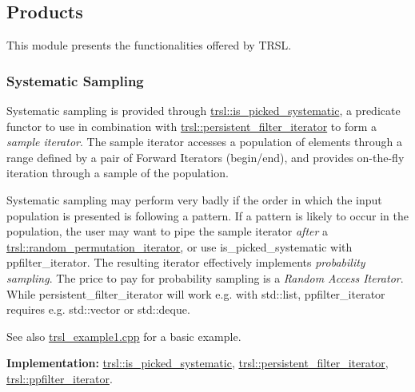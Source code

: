 \hypertarget{group__products}{
\subsection{Products}
\label{group__products}
}
This module presents the functionalities offered by TRSL.



\hypertarget{group__products_products_systematic_sampling}{}\subsubsection{Systematic Sampling}\label{group__products_products_systematic_sampling}
Systematic sampling is provided through \hyperlink{classtrsl_1_1is__picked__systematic}{trsl::is\_\-picked\_\-systematic}, a predicate functor to use in combination with \hyperlink{classtrsl_1_1persistent__filter__iterator}{trsl::persistent\_\-filter\_\-iterator} to form a {\itshape sample iterator\/}. The sample iterator accesses a population of elements through a range defined by a pair of Forward Iterators (begin/end), and provides on-\/the-\/fly iteration through a sample of the population.

Systematic sampling may perform very badly if the order in which the input population is presented is following a pattern. If a pattern is likely to occur in the population, the user may want to pipe the sample iterator {\itshape after\/} a \hyperlink{namespacetrsl_afb566791dfade70af49beaa5b816e7ee}{trsl::random\_\-permutation\_\-iterator}, or use is\_\-picked\_\-systematic with ppfilter\_\-iterator. The resulting iterator effectively implements {\itshape probability sampling\/}. The price to pay for probability sampling is a {\itshape Random Access Iterator\/}. While persistent\_\-filter\_\-iterator will work e.g. with {\ttfamily std::list}, ppfilter\_\-iterator requires e.g. {\ttfamily std::vector} or {\ttfamily std::deque}.

\begin{DoxySeeAlso}{See also}
\hyperlink{trsl__example1_8cpp-example}{trsl\_\-example1.cpp} for a basic example.
\end{DoxySeeAlso}

\begin{DoxyDescription}
\item[{\bfseries Implementation:}]\hyperlink{classtrsl_1_1is__picked__systematic}{trsl::is\_\-picked\_\-systematic}, \hyperlink{classtrsl_1_1persistent__filter__iterator}{trsl::persistent\_\-filter\_\-iterator}, \hyperlink{classtrsl_1_1ppfilter__iterator}{trsl::ppfilter\_\-iterator}.
\end{DoxyDescription}



